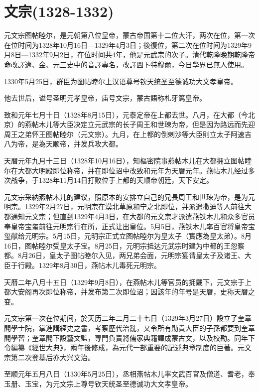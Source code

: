 
\section{文宗\tiny(1328-1332)}

元文宗图帖睦尔，是元朝第八位皇帝，蒙古帝国第十二位大汗，两次在位，第一次在位时间为1328年10月16日—1329年4月3日；後復位，第二次在位时间为1329年9月8日—1332年9月2日，在位时间共4年，他是元武宗的次子。清代乾隆晚期乾隆帝命改譯遼、金、元三史中的音譯專名，改譯圖卜特穆爾，今日學界已無人使用。

1330年5月25日，群臣为图帖睦尔上汉语尊号钦天统圣至德诚功大文孝皇帝。

他去世后，谥号圣明元孝皇帝，庙号文宗，蒙古語称札牙篤皇帝。

致和元年七月十日（1328年8月15日），元泰定帝在上都去世。八月，在大都（今北京）的燕帖木儿等大臣决定立元武宗的长子周王和世㻋为帝，但是因为路远而先迎周王之弟怀王图帖睦尔（元文宗）。九月，在上都的倒剌沙等大臣則立太子阿速吉八为帝，是為天顺帝，并发兵攻大都。

天曆元年九月十三日（1328年10月16日），知樞密院事燕帖木儿在大都拥立图帖睦尔在大都大明殿即位称帝，并在即位诏中改致和元年为天曆元年。燕帖木儿经过多次战争，于1328年11月14日打败位于上都的天顺帝朝廷，天下安定。

元文宗采納燕帖木儿的建议，照原本的安排立自己的兄長周王和世㻋为帝，是为元明宗。1329年2月27日，元明宗在漠北草原和宁之北即位，并派遣撒迪等人前往大都通知元文宗；但直到1329年4月3日，在大都的元文宗才派遣燕铁木儿和众多官员奉皇帝宝玺前往元明宗行在所，正式让出皇位。5月5日，燕铁木儿率百官将皇帝宝玺献给元明宗。5月15日，元明宗正式立图帖睦尔为皇太子（實應為皇太弟）。8月16日，图帖睦尔受皇太子宝。8月25日，元明宗抵达元武宗时建为中都的王忽察都。8月26日，皇太子图帖睦尔入见，两兄弟会面，元明宗宴请皇太子及诸王、大臣于行殿。1329年8月30日，燕帖木儿毒死元明宗。

天曆二年八月十五日（1329年9月8日），在燕帖木儿等官员的拥戴下，元文宗于上都大安阁再次即位称帝，并发布第二次即位诏；因該年的年号是天曆，史称天曆之变。

元文宗第一次在位期间，於天历二年二月二十七日（1329年3月27日）設立了奎章閣學士院，掌進講經史之書，考察歷代治亂，又令所有勛貴大臣的子孫都要到奎章閣學習；奎章閣下設藝文監，專門負責將儒家典籍譯成蒙古文，以及校勘。同年下令編纂《經世大典》，兩年後修成，為元代一部重要的記述典章制度的巨著。元文宗第二次登基后亦大兴文治。

至顺元年五月八日（1330年5月25日），丞相燕帖木儿率文武百官及僧道、耆老，奉玉册、玉宝，为元文宗上尊号钦天统圣至德诚功大文孝皇帝。

